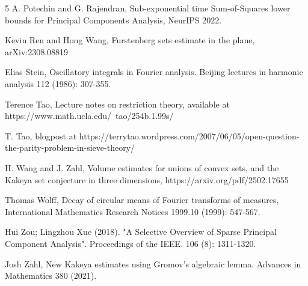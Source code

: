 \documentclass{amsart}
\begin{document}
\begin{thebibliography}{5}
 A. Potechin and G. Rajendran,  Sub-exponential time Sum-of-Squares lower bounds
for Principal Components Analysis,  NeurIPS 2022.

 Kevin Ren and Hong Wang,  Furstenberg sets estimate in the plane,  arXiv:2308.08819 

 Elias Stein,  Oscillatory integrals in Fourier analysis.  Beijing lectures in harmonic analysis 112 (1986): 307-355.

 Terence Tao, Lecture notes on restriction theory, available at https://www.math.ucla.edu/~tao/254b.1.99s/

 T. Tao, blogpost at https://terrytao.wordpress.com/2007/06/05/open-question-the-parity-problem-in-sieve-theory/

 H. Wang and J. Zahl,  Volume estimates for unions of convex sets, and the Kakeya set
conjecture in three dimensions,  https://arxiv.org/pdf/2502.17655

 Thomas Wolff,  Decay of circular means of Fourier transforms of measures,  International Mathematics Research Notices 1999.10 (1999): 547-567.

  Hui Zou; Lingzhou Xue (2018). "A Selective Overview of Sparse Principal Component Analysis". Proceedings of the IEEE. 106 (8): 1311-1320.

 Josh Zahl,  New Kakeya estimates using Gromov's algebraic lemma. Advances in Mathematics 380 (2021).
\end{thebibliography}
\end{document}
